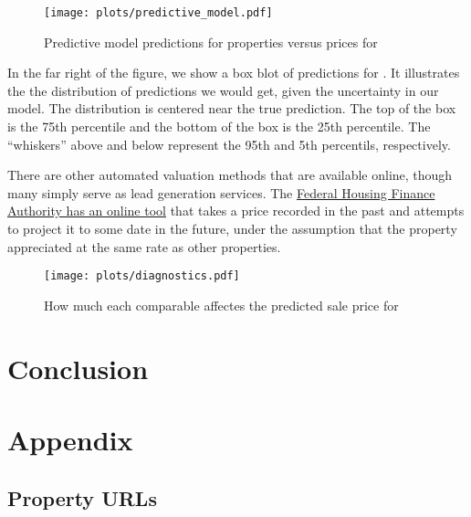 \documentclass[
12pt, %
letterpaper, %
oneside, %
headinclude,footinclude, %
BCOR5mm, %
]{scrartcl}
\begin{document}
\begin{figure}
\centering
\caption{Predictive model predictions for properties versus prices for \PropertyName{}} \label{fig:predictive_model}  
\texttt{[image: plots/predictive\_model.pdf]} 
\end{figure}

In the far right of the figure, we show a box blot of predictions for \PropertyName{}.
It illustrates the the distribution of predictions we would get, given the uncertainty in our model. 
The distribution is centered near the true prediction.
The top of the box is the 75th percentile and the bottom of the box is the 25th percentile.
The ``whiskers'' above and below represent the 95th and 5th percentils, respectively. 

There are other automated valuation methods that are available online, though many simply serve as lead generation services.
The \href{https://www.fhfa.gov/DataTools/Tools/Pages/HPI-Calculator.aspx}{Federal Housing Finance Authority has an online tool} that takes a price recorded in the past and attempts to project it to some date in the future, under the assumption that the property appreciated at the same rate as other properties. 

\begin{figure}
\centering
\caption{How much each comparable affectes the predicted sale price for \PropertyName{}} \label{fig:diagnostics}  
\texttt{[image: plots/diagnostics.pdf]} 
\end{figure}

\section{Conclusion}


\renewcommand{\refname}{\spacedlowsmallcaps{References}} %


\pagebreak

\appendix

\section{Appendix} 
\subsection{Property URLs} \label{sec:urls}
\end{document}
